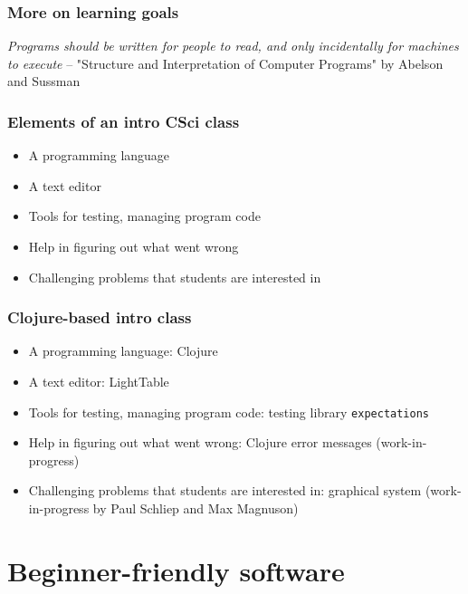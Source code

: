 \documentclass{beamer}
\newcommand{\comment}[1]{{\bf \tt  {#1}}}
\newcommand{\emcomment}[1]{\textcolor{ForestGreen}{\comment{Elena: {#1}}}}
\begin{document}
\begin{frame}[fragile]
\frametitle{More on learning goals}
{\it Programs should be written for people to read, and only incidentally for machines to execute} --	 
"Structure and Interpretation of Computer Programs" by Abelson and Sussman
\end{frame}

\begin{frame}[fragile]
\frametitle{Elements of an intro CSci class}
\begin{itemize}
\item A programming language
\item A text editor
\item Tools for testing, managing program code
\item Help in figuring out what went wrong
\item Challenging problems that students are interested in
\end{itemize}
\end{frame}

\begin{frame}[fragile]
\frametitle{Clojure-based intro class}
\begin{itemize}
\item A programming language: Clojure
\item A text editor: LightTable
\item Tools for testing, managing program code: testing library {\tt expectations}
\item Help in figuring out what went wrong: Clojure error messages (work-in-progress)
\item Challenging problems that students are interested in: graphical system (work-in-progress by Paul Schliep and Max Magnuson)
\end{itemize}
\end{frame}

\section{Beginner-friendly software}

%
\end{document}
